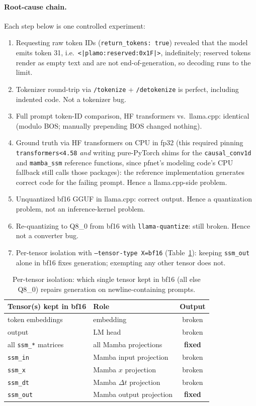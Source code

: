 \documentclass[10pt]{article}
\newcommand{\code}[1]{\texttt{#1}}
\begin{document}
\paragraph{Root-cause chain.} Each step below is one controlled experiment:

\begin{enumerate}
  \item Requesting raw token IDs (\code{return\_tokens: true}) revealed
    that the model emits token 31, i.e.\
    \code{<|plamo:}\allowbreak\code{reserved:}\allowbreak\code{0x1F|>},
    indefinitely;
    reserved tokens render as empty text and are not end-of-generation, so
    decoding runs to the limit.
  \item Tokenizer round-trip via \code{/tokenize} + \code{/detokenize} is
    perfect, including indented code. Not a tokenizer bug.
  \item Full prompt token-ID comparison, HF transformers vs.\ llama.cpp:
    identical (modulo BOS; manually prepending BOS changed nothing).
  \item Ground truth via HF transformers on CPU in fp32 (this required
    pinning \code{transformers<4.58} \emph{and} writing pure-PyTorch shims
    for the \code{causal\_conv1d} and \code{mamba\_ssm} reference functions,
    since pfnet's modeling code's CPU fallback still calls those packages):
    the reference implementation generates correct code for the failing
    prompt. Hence a llama.cpp-side problem.
  \item Unquantized bf16 GGUF in llama.cpp: correct output. Hence a
    quantization problem, not an inference-kernel problem.
  \item Re-quantizing to Q8\_0 from bf16 with \code{llama-quantize}: still
    broken. Hence not a converter bug.
  \item Per-tensor isolation with \code{--tensor-type X=bf16}
    (Table~\ref{tab:isolation}): keeping \code{ssm\_out} alone in bf16 fixes
    generation; exempting any other tensor does not.
\end{enumerate}

\begin{table}[ht]
\centering
\caption{Per-tensor isolation: which single tensor kept in bf16 (all else
Q8\_0) repairs generation on newline-containing prompts.}
\label{tab:isolation}
\begin{tabular}{llc}
\toprule
Tensor(s) kept in bf16 & Role & Output \\
\midrule
token embeddings & embedding & broken \\
output & LM head & broken \\
all \code{ssm\_*} matrices & all Mamba projections & \textbf{fixed} \\
\code{ssm\_in} & Mamba input projection & broken \\
\code{ssm\_x} & Mamba $x$ projection & broken \\
\code{ssm\_dt} & Mamba $\Delta t$ projection & broken \\
\code{ssm\_out} & Mamba output projection & \textbf{fixed} \\
\bottomrule
\end{tabular}
\end{table}
\end{document}
